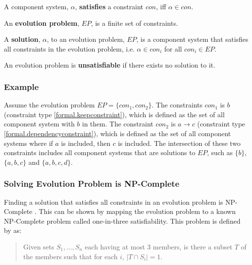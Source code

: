 \begin{defs}
\label{formal.constraintdefs}
A component system, $\alpha$, \textbf{satisfies} a constraint $con$, iff $\alpha \in con$.
\end{defs}

\begin{defs}
An \textbf{evolution problem}, $EP$, is a finite set of constraints.
\end{defs}

\begin{defs}
A \textbf{solution}, $\alpha$, to an evolution problem, $EP$, is a component system that satisfies all constraints in the evolution problem, i.e. $\alpha \in con_i$ for all $con_i \in EP$.  
\end{defs}

\begin{defs}
An evolution problem is \textbf{unsatisfiable} if there exists no solution to it.  
\end{defs}


\subsubsection{Example}
Assume the evolution problem $EP = \{con_1,con_2\}$.
The constraints $con_1$ is $b$ (constraint type \ref{formal.keepconstraint}), which is defined as the set of all component system with $b$ in them.
The constraint $con_2$ is $a \rightarrow c$ (constraint type \ref{formal.dependencyconstraint}), which is defined as the set of all component systems where if $a$ is included, then $c$ is included.
The intersection of these two constraints includes all component systems that are solutions to $EP$, 
such as $\{b\}$, $\{a,b,c\}$ and $\{a,b,c,d\}$.

\subsubsection{Solving Evolution Problem is NP-Complete}
Finding a solution that satisfies all constraints in an evolution problem is NP-Complete \citep{cook1971}.
This can be shown by mapping the evolution problem to a known NP-Complete problem called one-in-three satisfiability.
This problem is defined by \cite{Schaefer1978} as:
\begin{quote}
Given sets $S_1, \ldots, S_n$ each having at most 3 members, is there a subset $T$ of the members such that for each $i$, $|T \cap S_i|  =  1$.
\end{quote}

